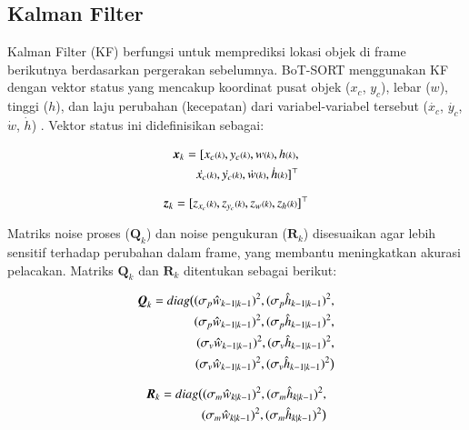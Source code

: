 \subsection{Kalman Filter}

Kalman Filter (KF) berfungsi untuk memprediksi lokasi objek di frame berikutnya berdasarkan pergerakan sebelumnya. BoT-SORT menggunakan KF dengan vektor status yang mencakup koordinat pusat objek ($x_c$, $y_c$), lebar ($w$), tinggi ($h$), dan laju perubahan (kecepatan) dari variabel-variabel tersebut ($\dot{x_c}$, $\dot{y_c}$, $\dot{w}$, $\dot{h}$) \parencite{bewley2016simple, wojke2017simple}. Vektor status ini didefinisikan sebagai:

\begin{equation}
  \begin{split}
    \vb*{x}_k = [x_{c}{\scriptstyle(k)}, y_{c}{\scriptstyle(k)}, w{\scriptstyle(k)}, h{\scriptstyle(k)}, \\        
    \dot{x_{c}}{\scriptstyle(k)}, \dot{y_{c}}{\scriptstyle(k)}, \dot{w}{\scriptstyle(k)}, \dot{h}{\scriptstyle(k)}]^\top
  \end{split}
\end{equation}

\begin{equation}
  \vb*{z}_k = [z_{x_c}{\scriptstyle(k)}, z_{y_c}{\scriptstyle(k)}, z_{w}{\scriptstyle(k)}, z_{h}{\scriptstyle(k)}]^\top
\end{equation}

Matriks noise proses ($\mathbf{Q}_k$) dan noise pengukuran ($\mathbf{R}_k$) disesuaikan agar lebih sensitif terhadap perubahan dalam frame, yang membantu meningkatkan akurasi pelacakan. Matriks $\mathbf{Q}_k$ dan $\mathbf{R}_k$ ditentukan sebagai berikut:

\begin{equation}
  \begin{split}
    \vb*{Q}_k = diag\big{(} (\sigma_{p} \hat{w}_{k-1|k-1})^2, (\sigma_{p} \hat{h}_{k-1|k-1})^2, \\
    (\sigma_{p} \hat{w}_{k-1|k-1})^2, (\sigma_{p} \hat{h}_{k-1|k-1})^2, \\
    (\sigma_{v} \hat{w}_{k-1|k-1})^2, (\sigma_{v} \hat{h}_{k-1|k-1})^2, \\ 
    (\sigma_{v} \hat{w}_{k-1|k-1})^2 ,(\sigma_{v} \hat{h}_{k-1|k-1})^2\big{)}
  \end{split}
\end{equation}

\begin{equation}
  \begin{split}
      \vb*{R}_k = diag\big{(}(\sigma_{m} \hat{w}_{k|k-1})^2, (\sigma_{m} \hat{h}_{k|k-1})^2, \\
      (\sigma_{m} \hat{w}_{k|k-1})^2, (\sigma_{m} \hat{h}_{k|k-1})^2\big{)} 
  \end{split}
\end{equation}

